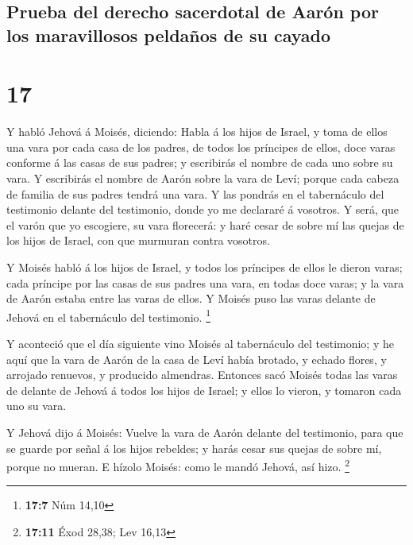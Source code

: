 \hypertarget{prueba-del-derecho-sacerdotal-de-aaruxf3n-por-los-maravillosos-peldauxf1os-de-su-cayado}{%
\subsection{Prueba del derecho sacerdotal de Aarón por los maravillosos
peldaños de su
cayado}\label{prueba-del-derecho-sacerdotal-de-aaruxf3n-por-los-maravillosos-peldauxf1os-de-su-cayado}}

\hypertarget{section-16}{%
\section{17}\label{section-16}}

 Y habló Jehová á Moisés, diciendo:  Habla á los
hijos de Israel, y toma de ellos una vara por cada casa de los padres,
de todos los príncipes de ellos, doce varas conforme á las casas de sus
padres; y escribirás el nombre de cada uno sobre su vara.  Y
escribirás el nombre de Aarón sobre la vara de Leví; porque cada cabeza
de familia de sus padres tendrá una vara.  Y las pondrás en
el tabernáculo del testimonio delante del testimonio, donde yo me
declararé á vosotros.  Y será, que el varón que yo
escogiere, su vara florecerá: y haré cesar de sobre mí las quejas de los
hijos de Israel, con que murmuran contra vosotros.

 Y Moisés habló á los hijos de Israel, y todos los príncipes
de ellos le dieron varas; cada príncipe por las casas de sus padres una
vara, en todas doce varas; y la vara de Aarón estaba entre las varas de
ellos.  Y Moisés puso las varas delante de Jehová en el
tabernáculo del testimonio. \footnote{\textbf{17:7} Núm 14,10}

 Y aconteció que el día siguiente vino Moisés al tabernáculo
del testimonio; y he aquí que la vara de Aarón de la casa de Leví había
brotado, y echado flores, y arrojado renuevos, y producido almendras.
 Entonces sacó Moisés todas las varas de delante de Jehová á
todos los hijos de Israel; y ellos lo vieron, y tomaron cada uno su
vara.

 Y Jehová dijo á Moisés: Vuelve la vara de Aarón delante
del testimonio, para que se guarde por señal á los hijos rebeldes; y
harás cesar sus quejas de sobre mí, porque no mueran.  E
hízolo Moisés: como le mandó Jehová, así hizo. \footnote{\textbf{17:11}
  Éxod 28,38; Lev 16,13}

